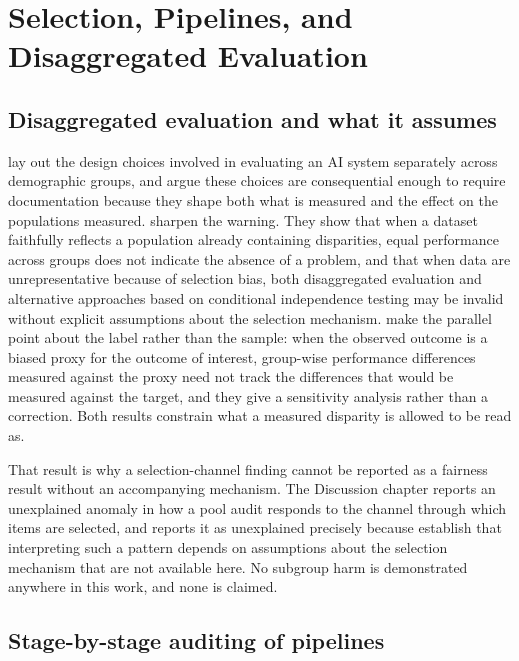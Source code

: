 \section{Selection, Pipelines, and Disaggregated Evaluation}
\label{sec:lit-selection}

\subsection{Disaggregated evaluation and what it assumes}

\citet{barocas2021disaggregated} lay out the design choices involved in evaluating an AI
system separately across demographic groups, and argue these choices are consequential enough
to require documentation because they shape both what is measured and the effect on the
populations measured. \citet{pfohl2025disaggregated} sharpen the warning. They show that when
a dataset faithfully reflects a population already containing disparities, equal performance
across groups does not indicate the absence of a problem, and that when data are
unrepresentative because of selection bias, both disaggregated evaluation and alternative
approaches based on conditional independence testing may be invalid without explicit
assumptions about the selection mechanism. \citet{fogliato2020fairness} make the parallel
point about the label rather than the sample: when the observed outcome is a biased proxy for
the outcome of interest, group-wise performance differences measured against the proxy need
not track the differences that would be measured against the target, and they give a
sensitivity analysis rather than a correction. Both results constrain what a measured
disparity is allowed to be read as.

That result is why a selection-channel finding cannot be reported as a fairness result
without an accompanying mechanism. The Discussion chapter reports an unexplained anomaly in
how a pool audit responds to the channel through which items are selected, and reports it as
unexplained precisely because \citet{pfohl2025disaggregated} establish that interpreting such
a pattern depends on assumptions about the selection mechanism that are not available here.
No subgroup harm is demonstrated anywhere in this work, and none is claimed.

\subsection{Stage-by-stage auditing of pipelines}

